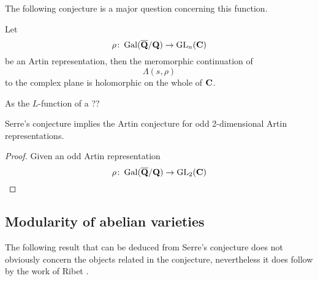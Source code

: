 \documentclass[a4paper,12pt]{article}
\begin{document}
The following conjecture is a major question concerning this function.

\begin{conjecture}
Let
\[
\rho\colon \operatorname{Gal}(\overline{\mathbf{Q}}/\mathbf{Q}) \to \operatorname{GL}_n(\mathbf{C})
\]
be an Artin representation, then the meromorphic continuation of
\[
\Lambda(s,\rho)
\]
to the complex plane is holomorphic on the whole of $\mathbf{C}$.
\end{conjecture}

As the $L$-function of a ??

\begin{prop}
Serre's conjecture implies the Artin conjecture for odd 2-dimensional Artin representations.
\end{prop}
\begin{proof}
Given an odd Artin representation
\[
\rho\colon \operatorname{Gal}(\overline{\mathbf{Q}}/\mathbf{Q})\to \operatorname{GL}_2(\mathbf{C})
\]

\end{proof}


\subsection{Modularity of abelian varieties}
The following result that can be deduced from Serre's conjecture does not obviously concern the objects related in the conjecture, nevertheless it does follow by the work of Ribet \cite{Ribet}.




\end{document}
